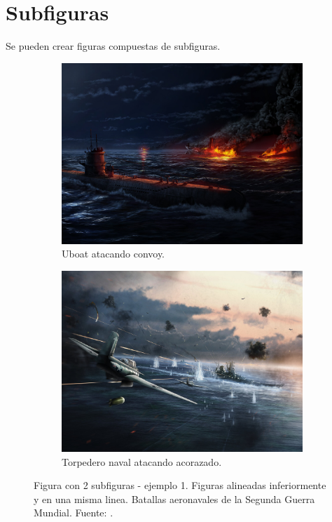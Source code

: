 \section{Subfiguras}
Se pueden crear figuras compuestas de subfiguras.
\begin{figure}[H]
	\centering
	\begin{subfigure}[b]{0.45\textwidth}
		\centering
		\includegraphics[width=\textwidth]{cuerpo/cap-objetos/imagenes/hoi4-convoy-raiding}
		\caption{Uboat atacando convoy.}
		\label{fig:hoi4-convoy-raiding}
	\end{subfigure}
	\begin{subfigure}[b]{0.45\textwidth}
		\centering
		\includegraphics[width=\textwidth]{cuerpo/cap-objetos/imagenes/hoi4-aeronaval-battle}
		\caption{Torpedero naval atacando acorazado.}
		\label{fig:hoi4-aeronaval-battle}
	\end{subfigure}
	\caption[Figura con 2 subfiguras - ejemplo 1.]{Figura con 2 subfiguras - ejemplo 1. Figuras alineadas inferiormente y en una misma linea. Batallas aeronavales de la Segunda Guerra Mundial. Fuente: \cite{hoi4}.}
	\label{fig:aeronavales}
\end{figure}
